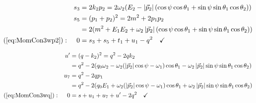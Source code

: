 \begin{align}
&&s_3 &= 2k_2p_2 = 2\omega_2(E_2-\left|\vec p_2\right|(\cos\psi\cos\theta_1+\sin\psi\sin\theta_1\cos\theta_2))\\
&&s_5 &= (p_1+p_2)^2 = 2m^2+2p_1p_2\\
&& &= 2(m^2+E_1E_2+\omega_2\left|\vec p_2\right|(\cos\psi\cos\theta_1+\sin\psi\sin\theta_1\cos\theta_2))\\
(\ref{eq:MomCon3wp2}): &&0 &= s_3+s_5+t_1+u_1-q^2\quad\checkmark
\end{align}

\begin{align}
&&u' &=(q-k_2)^2 = q^2-2qk_2\\
&& &= q^2-2(q_0\omega_2 -\omega_2(\left|\vec p_2\right|\cos\psi-\omega_1)\cos\theta_1-\omega_2\left|\vec p_2\right|\sin\psi\sin\theta_1\cos\theta_2)\\
&&u_7 &= q^2-2qp_1\\
&& &=q^2 - 2(q_0E_1 +\omega_2(\left|\vec p_2\right|\cos\psi-\omega_1)\cos\theta_1 + \omega_2\left|\vec p_2\right|\sin\psi\sin\theta_1\cos\theta_2)\\
(\ref{eq:MomCon3wq}): &&0 &=s+u_1+u_7+u'-2q^2\quad\checkmark
\end{align}
